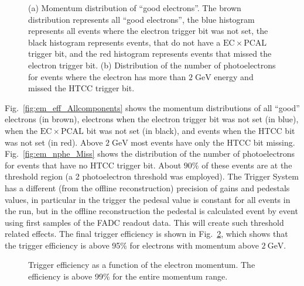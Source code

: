 \begin{figure}[!htb]
 \centering
 \caption{(a) Momentum distribution of ``good electrons''. The brown distribution represents all ``good electrons'', the blue histogram represents all events where the electron trigger bit was not set, the black histogram represents events, that do not have a $\mathrm{EC}\times \mathrm{PCAL}$ trigger bit, and the red histogram represents events that missed the electron trigger bit. (b) Distribution of the number of photoelectrons for events where the electron has more than $\mathrm{2\;GeV}$ energy and missed the HTCC trigger bit.}
 \label{fig:em_missed_events}
\end{figure}

Fig.~\ref{fig:em_eff_Allcomponents} shows the momentum distributions of all ``good'' electrons (in brown), electrons when the electron trigger bit was not set  (in blue), when the $\mathrm{EC}\times \mathrm{PCAL}$ bit was not set (in black), and events when the HTCC bit was not set (in red). Above $\mathrm{2\; GeV}$ most events have only the HTCC bit missing.  Fig.~\ref{fig:em_nphe_Miss} shows the distribution of the number of photoelectrons for events that have no  HTCC trigger bit. About $\mathrm{90\%}$ of these events are at the threshold region (a 2 photoelectron threshold was employed).  The Trigger System has a different (from the offline reconstruction) precision of gains and pedestals values, in particular in the trigger the pedesal value is constant for all events in the run, but in the offline reconstruction the pedestal is calculated event by event using first samples of the FADC readout data. This will create  such threshold related effects. The final trigger efficiency is shown in Fig.~\ref{fig:em_eff}, which shows that  the trigger efficiency is above 95\% for electrons with momentum above $\mathrm{2\ GeV}$.

\begin{figure}[!htb]
 \centering
 \caption{Trigger efficiency as a function of the electron momentum. The efficiency is above 99\% for the entire momentum range.}
 \label{fig:em_eff}
\end{figure}


